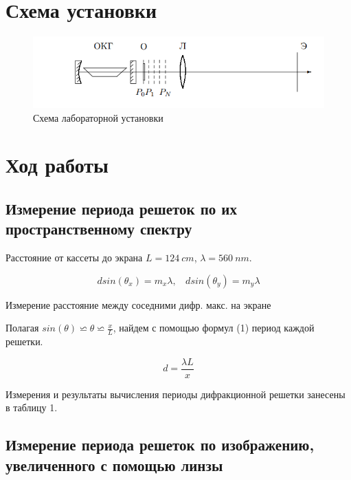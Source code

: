 \documentclass[15pt,a5paper,reqno]{article}
\begin{document}
\newpage

\section{Схема установки}

\begin{figure}[h!]
    \centering
    \includegraphics[width=12cm]{pics/scheme.png}
    \caption{Схема лабораторной установки}
    \label{}
\end{figure}

\section{Ход работы}


\subsection{Измерение периода решеток по их пространственному спектру}


Расстояние от кассеты до экрана $L = 124 \: cm$, $\lambda = 560 \: nm$.

\begin{equation}
    dsin(\theta_x) = m_x \lambda, \:\:\:\: d sin(\theta_y) = m_y \lambda     
  \label{first}
\end{equation}


\begin{table}[h!]
	\centering
	
	\caption{Измерение расстояние между соседними дифр. макс. на экране}
	\label{nu1}
\end{table}

Полагая $sin(\theta) \backsimeq \theta \backsimeq \frac{x}{L}$, найдем с помощью формул (1) период каждой решетки.

\[     d = \frac{\lambda L}{x}        \]

Измерения и результаты вычисления периоды дифракционной решетки занесены в таблицу 1.



\subsection{Измерение периода решеток по изображению, увеличенного с помощью линзы}
\end{document}
